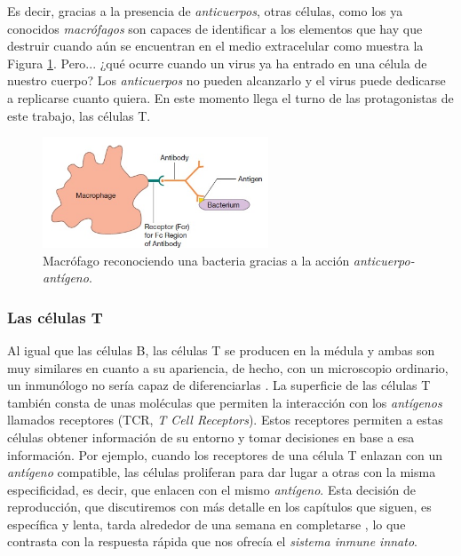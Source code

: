 Es decir, gracias a la presencia de \textit{anticuerpos}, otras células, como los ya conocidos \textit{macrófagos} son capaces de identificar a los elementos que hay que destruir cuando aún se encuentran en el medio extracelular como muestra la Figura \ref{fig:macrofago_anticuerpo}. Pero... ¿qué ocurre cuando un virus ya ha entrado en una célula de nuestro cuerpo? Los \textit{anticuerpos} no pueden alcanzarlo y el virus puede dedicarse a replicarse cuanto quiera. En este momento llega el turno de las protagonistas de este trabajo, las células T. 



\begin{figure}[t]
	\centering
	\includegraphics[width=0.6\textwidth]{2_macrofago_anticuerpo}
	\caption{Macrófago reconociendo una bacteria gracias a la acción \textit{anticuerpo-antígeno}.}
	\label{fig:macrofago_anticuerpo}
\end{figure}


\subsubsection{Las células T}
\label{Tcell}

Al igual que las células B, las células T se producen en la médula y ambas son muy similares en  cuanto a su apariencia, de hecho, con un microscopio ordinario, un inmunólogo no sería capaz de diferenciarlas \citep{theHowItWorks}. La superficie de las células T también consta de unas moléculas que permiten la interacción con los \textit{antígenos} llamados receptores (TCR, \textit{T Cell Receptors}). Estos receptores permiten a estas células obtener información de su entorno y tomar decisiones en base a esa información. Por ejemplo, cuando los receptores de una célula T enlazan con un \textit{antígeno} compatible, las células proliferan para dar lugar a otras con la misma especificidad, es decir, que enlacen con el mismo \textit{antígeno}. Esta decisión de reproducción, que discutiremos con más detalle en los capítulos que siguen, es específica y lenta, tarda alrededor de una semana en completarse \citep{theHowItWorks}, lo que contrasta con la respuesta rápida que nos ofrecía el \textit{sistema inmune innato}.

